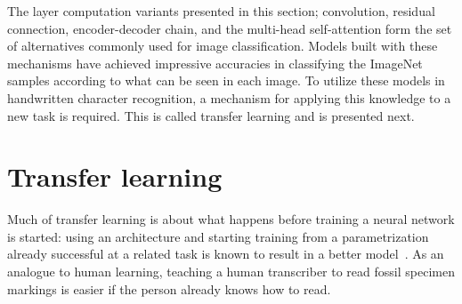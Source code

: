 \documentclass[english,twoside,openright]{UH_DS_MSc}
\begin{document}
The layer computation variants presented in this section; convolution, residual connection, encoder-decoder chain, and 
the multi-head self-attention form the set of alternatives commonly used for image classification. Models built with these mechanisms 
have achieved impressive accuracies in classifying the ImageNet samples according to what can be seen in each image.
To utilize these models in handwritten character recognition, a mechanism for applying this knowledge to a new task is required.
This is called transfer learning and is presented next.

\section{Transfer learning}
\label{sect:transfer_learning}

Much of transfer learning is about what happens before training a neural network is started: using an architecture and starting training from a parametrization already successful at a related task
is known to result in a better model~\cite{transferlearning_survey}. As an analogue to human learning, teaching a human transcriber to read fossil specimen markings is easier if the person already knows how to read.
\end{document}
